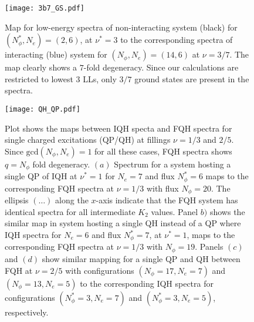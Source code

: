 \documentclass[prb,aps,epsfig,longbibliography,twocolumn]{revtex4-1}
\newcommand{\np}{N_{\phi}}
\begin{document}
\begin{figure}[h]
	\texttt{[image: 3b7\_GS.pdf]}
	\caption{
		Map for low-energy spectra of non-interacting system (black) for $(\np^{*},N_e)=(2,6)$, at $\nu^{*}=3$ to the corresponding spectra of interacting (blue) system for $(\np,N_e)=(14,6)$ at $\nu=3/7$. The map clearly shows a $7$-fold degeneracy. Since our calculations are restricted to lowest $3$ LLs, only $3/7$ ground states are present in the spectra.
	}
	\label{figA2}
\end{figure}

\begin{figure}[h!]
	\texttt{[image: QH\_QP.pdf]}
	\caption{ Plot shows the maps between IQH specta and FQH spectra for single charged excitations (QP/QH) at fillings $\nu=1/3$ and $2/5$. Since $\text{gcd}(\np,N_e)=1$ for all these cases, FQH spectra shows $q=\np$ fold degeneracy. $(a)$ Spectrum for a system hosting a single QP of IQH at $\nu^*=1$ for $N_e=7$ and flux $\np^*=6$ maps to the corresponding FQH spectra at $\nu=1/3$ with flux $\np=20$. The ellipsis $(\dots)$ along the $x$-axis indicate that the FQH system has identical spectra for all intermediate $K_2$ values. Panel $b)$ shows the similar map in system hosting a single QH instead of a QP where IQH spectra for $N_e=6$ and flux $\np^*=7$, at $\nu^*=1$,  maps to the corresponding FQH spectra at $\nu=1/3$ with $\np=19$. Panels $(c)$ and $(d)$ show similar mapping for a single QP and QH between FQH at $\nu=2/5$  with configurations $(\np=17,N_e=7)$ and $(\np=13,N_e=5)$  to the corresponding IQH spectra for configurations $(\np^*=3,N_e=7)$ and $(\np^*=3,N_e=5)$, respectively.
	}
	\label{figA3}
\end{figure}
\end{document}
